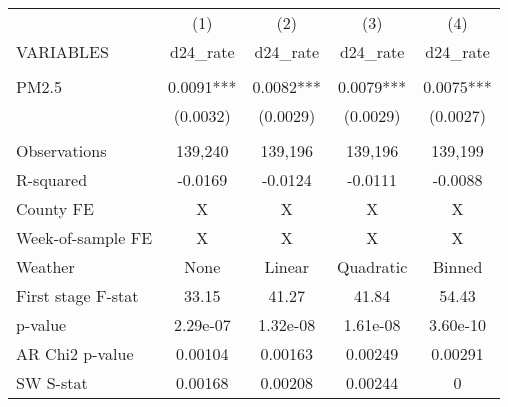 \begin{tabular}{lcccc} \hline
 & (1) & (2) & (3) & (4) \\
VARIABLES & d24\_rate & d24\_rate & d24\_rate & d24\_rate \\ \hline
 &  &  &  &  \\
PM2.5 & 0.0091*** & 0.0082*** & 0.0079*** & 0.0075*** \\
 & (0.0032) & (0.0029) & (0.0029) & (0.0027) \\
 &  &  &  &  \\
Observations & 139,240 & 139,196 & 139,196 & 139,199 \\
R-squared & -0.0169 & -0.0124 & -0.0111 & -0.0088 \\
County FE & X & X & X & X \\
Week-of-sample FE & X & X & X & X \\
Weather & None & Linear & Quadratic & Binned \\
First stage F-stat & 33.15 & 41.27 & 41.84 & 54.43 \\
p-value & 2.29e-07 & 1.32e-08 & 1.61e-08 & 3.60e-10 \\
AR Chi2 p-value & 0.00104 & 0.00163 & 0.00249 & 0.00291 \\
 SW S-stat & 0.00168 & 0.00208 & 0.00244 & 0 \\ \hline
\end{tabular}
